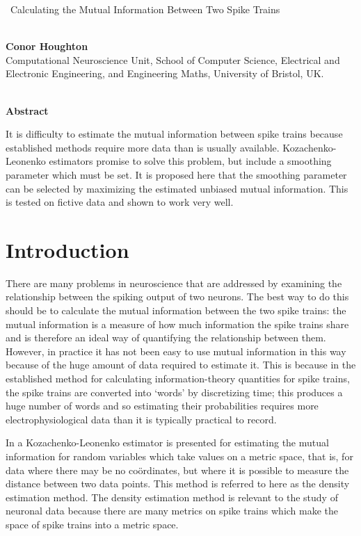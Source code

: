 \documentclass[12pt]{article}
\begin{document}
\noindent \
{\LARGE Calculating the Mutual Information Between Two Spike Trains}

\ \\
{\bf \large Conor Houghton}\\
{Computational Neuroscience Unit, School of Computer Science, Electrical and Electronic Engineering, and Engineering Maths, University of Bristol, UK.}\\
%
\ \vspace{-0mm}\\
%
\begin{center} {\bf Abstract} \end{center}
It is difficulty to estimate the mutual information between spike
trains because established methods require more data than is usually
available. Kozachenko-Leonenko estimators promise to solve this
problem, but include a smoothing parameter which must be set. It is
proposed here that the smoothing parameter can be selected by
maximizing the estimated unbiased mutual information. This is tested
on fictive data and shown to work very well.

\section{Introduction}

There are many problems in neuroscience that are addressed by
examining the relationship between the spiking output of two
neurons. The best way to do this should be to calculate the mutual
information between the two spike trains: the mutual information is a
measure of how much information the spike trains share and is
therefore an ideal way of quantifying the relationship between
them. However, in practice it has not been easy to use mutual
information in this way because of the huge amount of data required to
estimate it. This is because in the established method for calculating
information-theory quantities for spike trains, the spike trains are
converted into \lq{}words\rq{} by discretizing time; this produces a
huge number of words and so estimating their probabilities requires
more electrophysiological data than it is typically practical to
record.

In \citet{Houghton2015} a Kozachenko-Leonenko estimator
\citep{KozachenkoLeonenko1987,Victor2002,KraskovEtAl2004,TobinHoughton2013}
is presented for estimating the mutual information for random
variables which take values on a metric space, that is, for data where
there may be no co\"{o}rdinates, but where it is possible to measure
the distance between two data points. This method is referred to here
as the density estimation method. The density estimation method is
relevant to the study of neuronal data because there are many metrics
on spike trains
\citep{VictorPurpura1996,vanRossum2001,AronovEtAl2003,HoughtonSen2008,HoughtonVictor2010}
which make the space of spike trains into a metric space.
\end{document}
